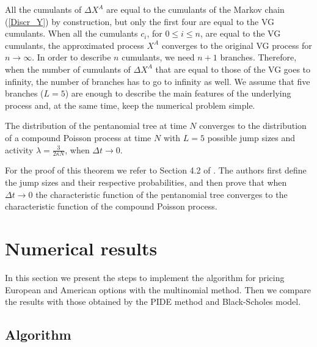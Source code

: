 \begin{Remark}
All the cumulants of $\Delta X^A$ are equal to the cumulants of the Markov chain (\ref{Discr_Y}) by construction, but only the first four are equal to the VG cumulants.
When all the cumulants $c_i$, for $0 \leq i \leq n$, are equal to the VG cumulants, the approximated process $X^A$ converges to
the original VG process for $n \to \infty$.
In order to describe $n$ cumulants, we need $n+1$ branches. Therefore, when the number of cumulants of $\Delta X^A$ that are equal to those of the VG goes to infinity, 
the number of branches has to go to infinity as well.
We assume that five branches ($L=5$) are enough to describe the main features of the underlying process and, at the same time, keep the numerical
problem simple. 
\end{Remark}

\begin{Theorem}
The distribution of the pentanomial tree at time $N$ converges to the distribution of a compound Poisson process at time $N$ with $L=5$ possible jump sizes and activity $\lambda = \frac{3}{2 \bar \kappa N}$, when $\Delta t \to 0$.   
\end{Theorem}
For the proof of this theorem  
we refer to Section 4.2 of \cite{YaPr06}. The authors first define the jump sizes and their respective probabilities, and then
prove that when $\Delta t \to 0$ the characteristic function of the pentanomial tree converges to the 
characteristic function of the compound Poisson process.



\section{Numerical results} \label{sec4_ch3}

In this section we present the steps to implement the algorithm for pricing European and American options with the multinomial method.
Then we compare the results with those obtained by the PIDE method and Black-Scholes model.

\subsection{Algorithm}

